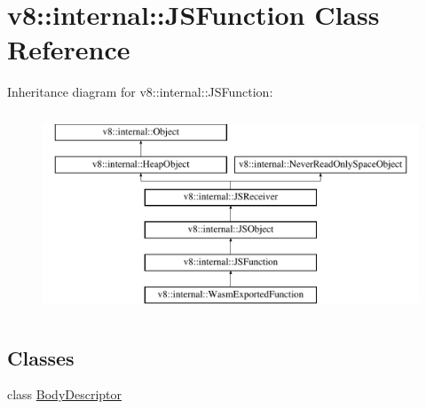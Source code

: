 \hypertarget{classv8_1_1internal_1_1JSFunction}{}\section{v8\+:\+:internal\+:\+:J\+S\+Function Class Reference}
\label{classv8_1_1internal_1_1JSFunction}
Inheritance diagram for v8\+:\+:internal\+:\+:J\+S\+Function\+:\begin{figure}[H]
\begin{center}
\leavevmode
\includegraphics[height=6.000000cm]{classv8_1_1internal_1_1JSFunction}
\end{center}
\end{figure}
\subsection*{Classes}
\begin{DoxyCompactItemize}
\item 
class \mbox{\hyperlink{classv8_1_1internal_1_1JSFunction_1_1BodyDescriptor}{Body\+Descriptor}}
\end{DoxyCompactItemize}
